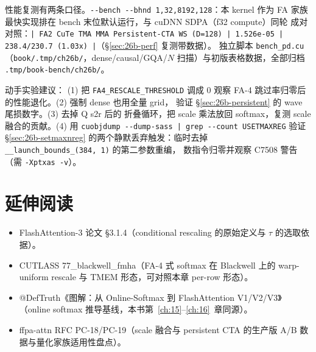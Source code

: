 性能复测有两条口径。\texttt{-{}-bench -{}-bhnd 1,32,8192,128}：本 kernel 作为
FA 家族最快实现排在 bench 末位默认运行，与 cuDNN SDPA（f32 compute）同轮
成对对照：\texttt{| FA2 CuTe TMA MMA Persistent-CTA WS (D=128) | 1.526e-05
| 238.4/230.7 (1.03x) |}（\S\ref{sec:26b-perf} 复测带数据）。
独立脚本 \texttt{bench\_pd.cu}（\texttt{book/.tmp/ch26b/}，dense/causal/GQA/$N$
扫描）与初版表格数据，全部归档 \texttt{.tmp/book-bench/ch26b/}。

动手实验建议：
(1) 把 \texttt{FA4\_\allowbreak{}RESCALE\_\allowbreak{}THRESHOLD} 调成 0
观察 FA-4 跳过率归零后的性能退化。(2) 强制 dense 也用全量 grid，
验证 \S\ref{sec:26b-persistent} 的 wave 尾损数字。(3) 去掉 Q s2r 后的
折叠循环，把 scale 乘法放回 softmax，复测 scale 融合的贡献。(4) 用
\texttt{cuobjdump -{}-dump-sass | grep -{}-count USETMAXREG} 验证
\S\ref{sec:26b-setmaxnreg} 的两个静默丢弃触发：临时去掉
\texttt{\_\_launch\_\allowbreak{}bounds\_\allowbreak{}(384,~1)} 的第二参数重编，
数指令归零并观察 C7508 警告（需 \texttt{-Xptxas -v}）。

\section*{延伸阅读}

\begin{itemize}[itemsep=1pt]
  \item FlashAttention-3 论文 \S3.1.4（conditional rescaling 的原始定义与
        $\tau$ 的选取依据）。
  \item CUTLASS 77\_blackwell\_fmha（FA-4 式 softmax 在 Blackwell 上的
        warp-uniform rescale 与 TMEM 形态，可对照本章 per-row 形态）。
  \item @DefTruth《图解：从 Online-Softmax 到 FlashAttention V1/V2/V3》
        （online softmax 推导基线，本书第~\ref{ch:15}--\ref{ch:16}~章同源）。
  \item ffpa-attn RFC PC-18/PC-19（scale 融合与 persistent CTA 的生产版
        A/B 数据与量化家族适用性盘点）。
\end{itemize}
